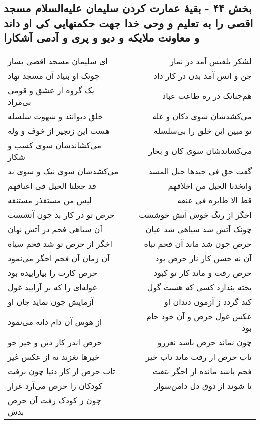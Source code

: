 \begin{center}
\section*{بخش ۴۴ - بقیهٔ عمارت کردن سلیمان علیه‌السلام مسجد اقصی را به تعلیم و وحی خدا جهت حکمتهایی کی او داند و معاونت ملایکه و دیو  و پری و آدمی آشکارا}
\label{sec:sh044}
\begin{longtable}{l p{0.5cm} r}
ای سلیمان مسجد اقصی بساز
&&
لشکر بلقیس آمد در نماز
\\
چونک او بنیاد آن مسجد نهاد
&&
جن و انس آمد بدن در کار داد
\\
یک گروه از عشق و قومی بی‌مراد
&&
هم‌چنانک در ره طاعت عباد
\\
خلق دیوانند و شهوت سلسله
&&
می‌کشدشان سوی دکان و غله
\\
هست این زنجیر از خوف و وله
&&
تو مبین این خلق را بی‌سلسله
\\
می‌کشاندشان سوی کسب و شکار
&&
می‌کشاندشان سوی کان و بحار
\\
می‌کشدشان سوی نیک و سوی بد
&&
گفت حق فی جیدها حبل المسد
\\
قد جعلنا الحبل فی اعناقهم
&&
واتخذنا الحبل من اخلاقهم
\\
لیس من مستقذر مستنقه
&&
قط الا طایره فی عنقه
\\
حرص تو در کار بد چون آتشست
&&
اخگر از رنگ خوش آتش خوشست
\\
آن سیاهی فحم در آتش نهان
&&
چونک آتش شد سیاهی شد عیان
\\
اخگر از حرص تو شد فحم سیاه
&&
حرص چون شد ماند آن فحم تباه
\\
آن زمان آن فحم اخگر می‌نمود
&&
آن نه حسن کار نار حرص بود
\\
حرص کارت را بیاراییده بود
&&
حرص رفت و ماند کار تو کبود
\\
غوله‌ای را که بر آرایید غول
&&
پخته پندارد کسی که هست گول
\\
آزمایش چون نماید جان او
&&
کند گردد ز آزمون دندان او
\\
از هوس آن دام دانه می‌نمود
&&
عکس غول حرص و آن خود خام بود
\\
حرص اندر کار دین و خیر جو
&&
چون نماند حرص باشد نغزرو
\\
خیرها نغزند نه از عکس غیر
&&
تاب حرص ار رفت ماند تاب خیر
\\
تاب حرص از کار دنیا چون برفت
&&
فحم باشد مانده از اخگر بتفت
\\
کودکان را حرص می‌آرد غرار
&&
تا شوند از ذوق دل دامن‌سوار
\\
چون ز کودک رفت آن حرص بدش

\end{longtable}
\end{center}
